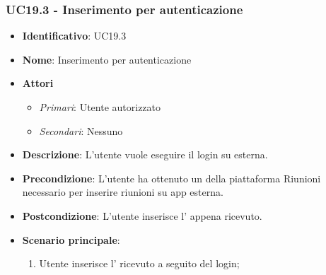 \subsubsection{UC19.3 - Inserimento  per autenticazione }
\begin{itemize}
	\item \textbf{Identificativo}: UC19.3
	\item \textbf{Nome}: Inserimento  per autenticazione
	\item \textbf{Attori}
	\begin{itemize} 
		\item \textit{Primari}: Utente autorizzato
		\item \textit{Secondari}: Nessuno
	\end{itemize}
	\item \textbf{Descrizione}: L'utente vuole eseguire il login su  esterna.
	\item \textbf{Precondizione}: L'utente ha ottenuto un  della piattaforma Riunioni necessario per inserire riunioni su app esterna.
	\item \textbf{Postcondizione}: L'utente inserisce l' appena ricevuto.
	\item \textbf{Scenario principale}: \begin{enumerate}
		\item Utente inserisce l' ricevuto a seguito del login; 
	\end{enumerate}
\end{itemize}


